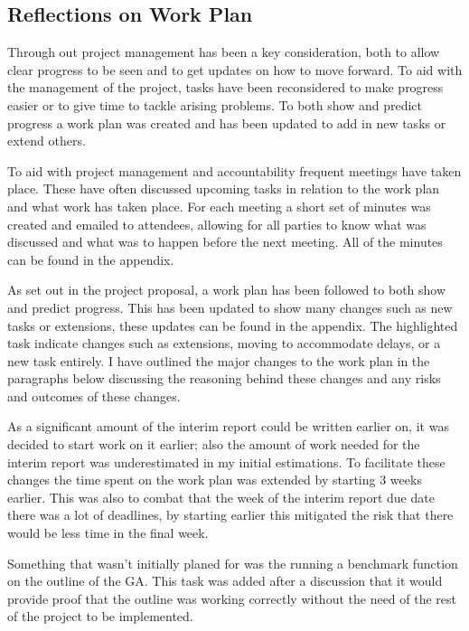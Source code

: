 \documentclass[a4paper]{article}
\begin{document}
\subsection{Reflections on Work Plan}
\par
Through out project management has been a key consideration, both to allow clear progress to be seen and to get updates on how to move forward.
To aid with the management of the project, tasks have been reconsidered to make progress easier or to give time to tackle arising problems.
To both show and predict progress a work plan was created and has been updated to add in new tasks or extend others.
\\ \par
To aid with project management and accountability frequent meetings have taken place.
These have often discussed upcoming tasks in relation to the work plan and what work has taken place.
For each meeting a short set of minutes was created and emailed to attendees, allowing for all parties to know what was discussed and what was to happen before the next meeting.
All of the minutes can be found in the appendix.
\par
As set out in the project proposal, a work plan has been followed to both show and predict progress.
This has been updated to show many changes such as new tasks or extensions, these updates can be found in the appendix.
The highlighted task indicate changes such as extensions, moving to accommodate delays, or a new task entirely.
I have outlined the major changes to the work plan in the paragraphs below discussing the reasoning behind these changes and any risks and outcomes of these changes.
\\ \par
As a significant amount of the interim report could be written earlier on, it was decided to start work on it earlier; also the amount of work needed for the interim report was underestimated in my initial estimations.
To facilitate these changes the time spent on the work plan was extended by starting 3 weeks earlier.
This was also to combat that the week of the interim report due date there was a lot of deadlines, by starting earlier this mitigated the risk that there would be less time in the final week.
\par
Something that wasn't initially planed for was the running a benchmark function on the outline of the GA\@.
This task was added after a discussion that it would provide proof that the outline was working correctly without the need of the rest of the project to be implemented.
\end{document}
